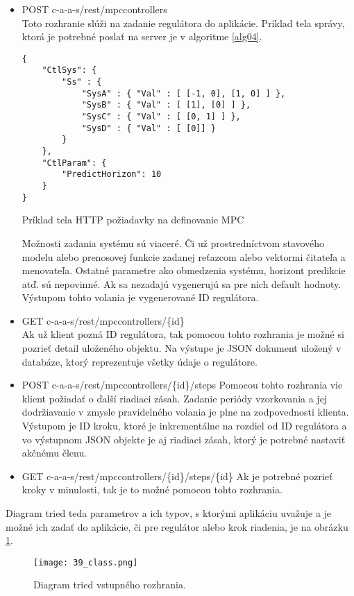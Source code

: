 \begin{itemize}
  \begin{itemize}
    \item POST c-a-a-s/rest/mpccontrollers \\
Toto rozhranie slúži na zadanie regulátora do aplikácie. Príklad tela správy, ktorá je potrebné poslať na server je v algoritme \ref{alg04}.   
\begin{algorithm}
%
\begin{lstlisting}
{
    "CtlSys": {
        "Ss" : {
            "SysA" : { "Val" : [ [-1, 0], [1, 0] ] },
            "SysB" : { "Val" : [ [1], [0] ] },
            "SysC" : { "Val" : [ [0, 1] ] },
            "SysD" : { "Val" : [ [0]] }
        }
    },
    "CtlParam": {
        "PredictHorizon": 10
    }
}
\end{lstlisting}
 \caption{Príklad tela HTTP požiadavky na definovanie MPC}
 \label{alg04}
\end{algorithm}  
Možnosti zadania systému sú viaceré. Či už prostredníctvom stavového modelu alebo prenosovej funkcie zadanej reťazcom alebo vektormi čitateľa a menovateľa. Ostatné parametre ako obmedzenia systému, horizont predikcie atď. sú nepovinné. Ak sa nezadajú vygenerujú sa pre nich default hodnoty. Výstupom tohto volania  je vygenerované ID regulátora.
    \item GET c-a-a-s/rest/mpccontrollers/\{id\} \\
Ak už klient pozná ID regulátora, tak pomocou tohto rozhrania je možné si pozrieť detail uloženého objektu. Na výstupe je JSON dokument uložený v databáze, ktorý reprezentuje všetky údaje o regulátore.
    \item POST c-a-a-s/rest/mpccontrollers/\{id\}/steps
Pomocou tohto rozhrania vie klient požiadať o ďalší riadiaci zásah. Zadanie periódy vzorkovania a jej dodržiavanie v zmysle pravidelného volania je plne na zodpovednosti klienta. Výstupom je ID kroku, ktoré je inkrementálne na rozdiel od ID regulátora a vo výstupnom JSON objekte je aj riadiaci zásah, ktorý je potrebné nastaviť akčnému členu.
    \item GET c-a-a-s/rest/mpccontrollers/\{id\}/steps/\{id\}       
Ak je potrebné pozrieť kroky v minulosti, tak je to možné pomocou  tohto rozhrania.  
  \end{itemize} 
Diagram tried teda parametrov a ich typov, s ktorými aplikáciu uvažuje a je možné ich zadať do aplikácie, či pre regulátor alebo krok riadenia, je na obrázku \ref{39_class}. 
\end{itemize} 
\begin{landscape}
\begin{figure}[!htbp]
\centering
\texttt{[image: 39\_class.png]}
\caption{Diagram tried vstupného rozhrania.}
\label{39_class}
\end{figure} 
\end{landscape}

